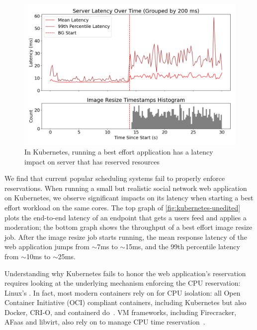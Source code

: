 \begin{figure}[t]
    \centering
    \includegraphics[width=\columnwidth]{graphs/kubernetes-unedited.png}
    \caption{In Kubernetes, running a best effort application has a latency
    impact on server that has reserved resources}\label{fig:kubernetes-unedited}
\end{figure}

We find that current popular scheduling systems fail to properly enforce
reservations. When running a small but realistic social network web application
on Kubernetes, we observe significant impacts on its latency when starting a
best effort workload on the same cores. The top graph of
\autoref{fig:kubernetes-unedited} plots the end-to-end latency of an endpoint
that gets a users feed and applies a moderation; the bottom graph shows the
throughput of a best effort image resize job. After the image resize job starts
running, the mean response latency of the web application jumps from $\sim$7ms
to $\sim$15ms, and the 99th percentile latency from $\sim$10ms to $\sim$25ms.

Understanding why Kubernetes fails to honor the web application's reservation
requires looking at the underlying mechanism enforcing the CPU reservation:
Linux's \cgroups{}. In fact, most modern containers rely on \cgroups{} for CPU
isolation: all Open Container Initiative (OCI) compliant containers, including
Kubernetes but also Docker, CRI-O, and containerd
do~\cite{oci-cgroups,docker-docs-cgroups,container-isolation-article}. VM
frameworks, including Firecracker, AFaas and libvirt, also rely on \cgroups{} to
manage CPU time reservation~\cite{firecracker-cgroups,afaas,libvirt-cgroups}.

